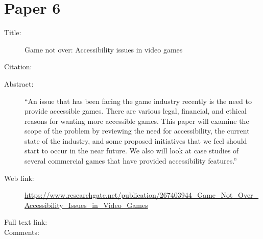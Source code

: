 \documentclass{scrartcl}
\begin{document}
\section*{Paper 6}
\begin{description}
\item[Title:] Game not over: Accessibility issues in video games
\item[Citation:] \cite{Bierre}
\item[Abstract:] ``An issue that has been facing the game industry recently is the need to provide accessible games. There are various legal, financial, and ethical reasons for wanting more accessible games. This paper will examine the scope of the problem by reviewing the need for accessibility, the current state of the industry, and some proposed initiatives that we feel should start to occur in the near future. We also will look at case studies of several commercial games that have provided accessibility features.''
\item[Web link:] \url {https://www.researchgate.net/publication/267403944_Game_Not_Over_Accessibility_Issues_in_Video_Games}
\item[Full text link:]
\item[Comments:]
\end{description}
\end{document}
